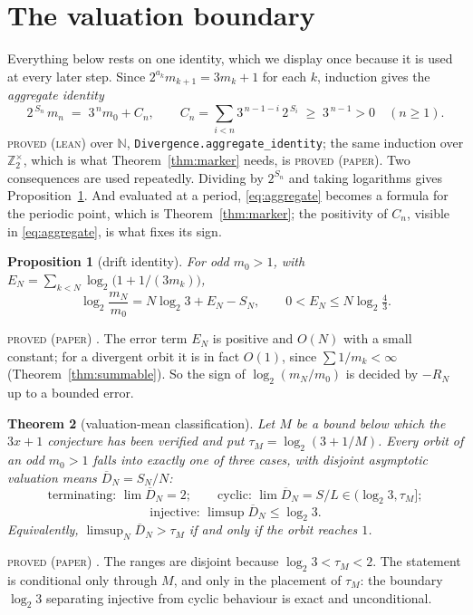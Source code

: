 \documentclass[11pt,reqno]{amsart}
\theoremstyle{plain}
\newtheorem{theorem}{Theorem}[section]
\newtheorem{proposition}[theorem]{Proposition}
\theoremstyle{definition}
\newcommand{\Zt}{\mathbb{Z}_2}
\newcommand{\N}{\mathbb{N}}
\newcommand{\lab}[1]{\textnormal{\textsc{\small #1}}}
\begin{document}
\section{The valuation boundary}\label{sec:boundary}

Everything below rests on one identity, which we display once because it is used
at every later step. Since $2^{a_k}m_{k+1}=3m_k+1$ for each $k$, induction gives
the \emph{aggregate identity}
\begin{equation}\label{eq:aggregate}
2^{\,S_n}\,m_n\;=\;3^{\,n}m_0+C_n,\qquad
C_n=\sum_{i<n}3^{\,n-1-i}\,2^{\,S_i}\;\ge\;3^{\,n-1}>0\quad(n\ge1).
\end{equation}
\lab{proved (lean)} over $\N$, \texttt{Divergence.aggregate\_identity}; the same
induction over $\Zt^{\times}$, which is what Theorem~\ref{thm:marker} needs, is
\lab{proved (paper)}. Two consequences are used repeatedly. Dividing by $2^{S_n}$
and taking logarithms gives Proposition~\ref{prop:drift}. And evaluated at a
period, \eqref{eq:aggregate} becomes a formula for the periodic point, which is
Theorem~\ref{thm:marker}; the positivity of $C_n$, visible in
\eqref{eq:aggregate}, is what fixes its sign.

\begin{proposition}[drift identity]\label{prop:drift}
For odd $m_0>1$, with $E_N=\sum_{k<N}\log_2\!\bigl(1+1/(3m_k)\bigr)$,
\[
\log_2\frac{m_N}{m_0}=N\log_2 3+E_N-S_N,
\qquad 0<E_N\le N\log_2\tfrac43 .
\]
\end{proposition}
\lab{proved (paper)} \cite{DeJesusVM}. The error term $E_N$ is positive and
$O(N)$ with a small constant; for a divergent orbit it is in fact
$O(1)$, since $\sum 1/m_k<\infty$ (Theorem~\ref{thm:summable}). So the sign of
$\log_2(m_N/m_0)$ is decided by $-R_N$ up to a bounded error.

\begin{theorem}[valuation-mean classification]\label{thm:vm}
Let $M$ be a bound below which the $3x+1$ conjecture has been verified and put
$\tau_M=\log_2(3+1/M)$. Every orbit of an odd $m_0>1$ falls into exactly one of
three cases, with disjoint asymptotic valuation means
$\overline D_N=S_N/N$:
\[
\text{terminating: }\lim \overline D_N=2;\qquad
\text{cyclic: }\lim \overline D_N=S/L\in(\log_2 3,\tau_M];
\]
\[
\text{injective: }\limsup \overline D_N\le\log_2 3 .
\]
Equivalently, $\limsup_N \overline D_N>\tau_M$ if and only if the orbit reaches $1$.
\end{theorem}
\lab{proved (paper)} \cite{DeJesusVM}. The ranges are disjoint because
$\log_2 3<\tau_M<2$. The statement is conditional only through $M$, and only in
the placement of $\tau_M$: the boundary $\log_2 3$ separating injective from
cyclic behaviour is exact and unconditional.
\end{document}
